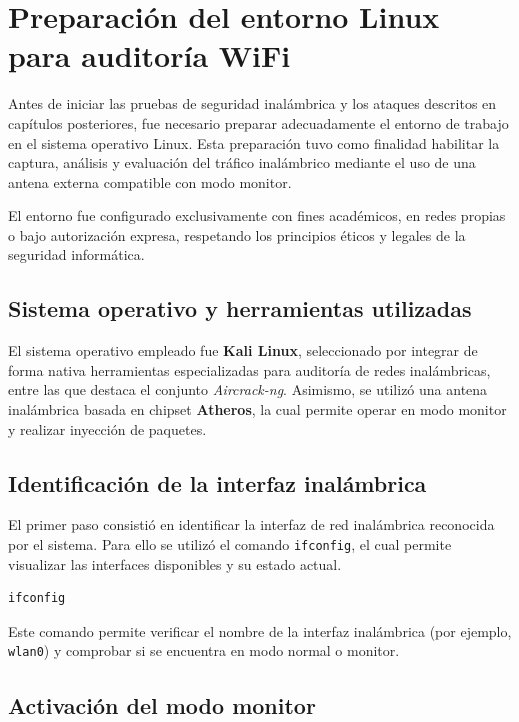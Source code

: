 \section{Preparación del entorno Linux para auditoría WiFi}

Antes de iniciar las pruebas de seguridad inalámbrica y los ataques descritos en capítulos posteriores, fue necesario preparar adecuadamente el entorno de trabajo en el sistema operativo Linux. Esta preparación tuvo como finalidad habilitar la captura, análisis y evaluación del tráfico inalámbrico mediante el uso de una antena externa compatible con modo monitor.

El entorno fue configurado exclusivamente con fines académicos, en redes propias o bajo autorización expresa, respetando los principios éticos y legales de la seguridad informática.

\subsection{Sistema operativo y herramientas utilizadas}

El sistema operativo empleado fue \textbf{Kali Linux}, seleccionado por integrar de forma nativa herramientas especializadas para auditoría de redes inalámbricas, entre las que destaca el conjunto \textit{Aircrack-ng}. Asimismo, se utilizó una antena inalámbrica basada en chipset \textbf{Atheros}, la cual permite operar en modo monitor y realizar inyección de paquetes.

\subsection{Identificación de la interfaz inalámbrica}

El primer paso consistió en identificar la interfaz de red inalámbrica reconocida por el sistema. Para ello se utilizó el comando \texttt{ifconfig}, el cual permite visualizar las interfaces disponibles y su estado actual.

\begin{lstlisting}[language=bash, caption={Identificación de interfaces de red}]
ifconfig
\end{lstlisting}

Este comando permite verificar el nombre de la interfaz inalámbrica (por ejemplo, \texttt{wlan0}) y comprobar si se encuentra en modo normal o monitor.

\subsection{Activación del modo monitor}

